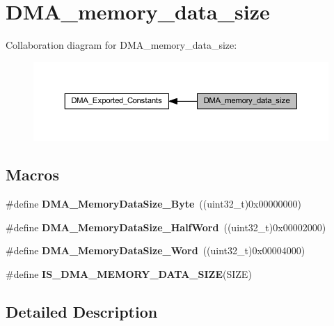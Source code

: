 \hypertarget{group___d_m_a__memory__data__size}{}\section{D\+M\+A\+\_\+memory\+\_\+data\+\_\+size}
\label{group___d_m_a__memory__data__size}
Collaboration diagram for D\+M\+A\+\_\+memory\+\_\+data\+\_\+size\+:\nopagebreak
\begin{figure}[H]
\begin{center}
\leavevmode
\includegraphics[width=350pt]{group___d_m_a__memory__data__size}
\end{center}
\end{figure}
\subsection*{Macros}
\begin{DoxyCompactItemize}
\item 
\mbox{\label{group___d_m_a__memory__data__size_gad6093bccb60ff9adf81e21c73c58ba17}} 
\#define {\bfseries D\+M\+A\+\_\+\+Memory\+Data\+Size\+\_\+\+Byte}~((uint32\+\_\+t)0x00000000)
\item 
\mbox{\label{group___d_m_a__memory__data__size_ga74c9b4e547f5eaaf35d4fd3d01ed5741}} 
\#define {\bfseries D\+M\+A\+\_\+\+Memory\+Data\+Size\+\_\+\+Half\+Word}~((uint32\+\_\+t)0x00002000)
\item 
\mbox{\label{group___d_m_a__memory__data__size_gaff403722a6f82d4b34c9ef306507bb98}} 
\#define {\bfseries D\+M\+A\+\_\+\+Memory\+Data\+Size\+\_\+\+Word}~((uint32\+\_\+t)0x00004000)
\item 
\#define {\bfseries I\+S\+\_\+\+D\+M\+A\+\_\+\+M\+E\+M\+O\+R\+Y\+\_\+\+D\+A\+T\+A\+\_\+\+S\+I\+ZE}(S\+I\+ZE)
\end{DoxyCompactItemize}


\subsection{Detailed Description}



